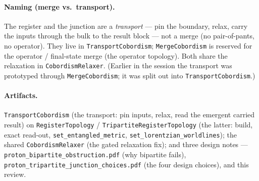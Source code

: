 \documentclass[11pt]{article}
\newcommand{\code}[1]{\texttt{#1}}
\begin{document}
\paragraph{Naming (merge vs.\ transport).} The register and the junction are a
\emph{transport} --- pin the boundary, relax, carry the inputs through the bulk to
the result block --- not a merge (no pair-of-pants, no operator). They live in
\code{TransportCobordism}; \code{MergeCobordism} is reserved for the operator /
final-state merge (the operator topology). Both share the relaxation in
\code{CobordismRelaxer}. (Earlier in the session the transport was prototyped
through \code{MergeCobordism}; it was split out into \code{TransportCobordism}.)

\paragraph{Artifacts.} \code{TransportCobordism} (the transport: pin inputs, relax,
read the emergent carried result) on \code{RegisterTopology} /
\code{TripartiteRegisterTopology} (the latter: build, exact read-out,
\code{set\_entangled\_metric}, \code{set\_lorentzian\_worldlines}); the shared
\code{CobordismRelaxer} (the gated relaxation fix); and three design notes ---
\code{proton\_bipartite\_obstruction.pdf} (why bipartite fails),
\code{proton\_tripartite\_junction\_choices.pdf} (the four design choices), and
this review.
\end{document}
